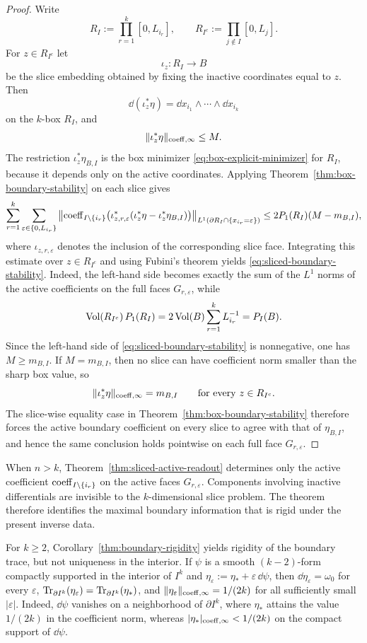 \begin{proof}
Write
\[
R_I:=\prod_{r=1}^k [0,L_{i_r}],
\qquad
R_{I^c}:=\prod_{j\notin I}[0,L_j].
\]
For $z\in R_{I^c}$ let
\[
\iota_z:R_I\to B
\]
be the slice embedding obtained by fixing the inactive coordinates equal to
$z$. Then
\[
\dd(\iota_z^\ast\eta)=\dd x_{i_1}\wedge\cdots\wedge \dd x_{i_k}
\]
on the $k$-box $R_I$, and
\[
\lVert \iota_z^\ast\eta \rVert_{\mathrm{coeff},\infty}\le M.
\]
The restriction $\iota_z^\ast\eta_{B,I}$ is the box minimizer
\eqref{eq:box-explicit-minimizer} for $R_I$, because it depends only on the
active coordinates. Applying Theorem~\ref{thm:box-boundary-stability} on each
slice gives
\[
\sum_{r=1}^k\sum_{\varepsilon\in\{0,L_{i_r}\}}
\left\|
\mathrm{coeff}_{I\setminus\{i_r\}}
\bigl(
\iota_{z,r,\varepsilon}^\ast(\iota_z^\ast\eta-\iota_z^\ast\eta_{B,I})
\bigr)
\right\|_{L^1(\partial R_I\cap\{x_{i_r}=\varepsilon\})}
\le
2P_1(R_I)(M-m_{B,I}),
\]
where $\iota_{z,r,\varepsilon}$ denotes the inclusion of the corresponding
slice face. Integrating this estimate over $z\in R_{I^c}$ and using Fubini's
theorem yields \eqref{eq:sliced-boundary-stability}. Indeed, the left-hand
side becomes exactly the sum of the $L^1$ norms of the active coefficients on
the full faces $G_{r,\varepsilon}$, while
\[
\operatorname{Vol}(R_{I^c})\,P_1(R_I)
=
2\operatorname{Vol}(B)\sum_{r=1}^k L_{i_r}^{-1}
=
P_I(B).
\]
Since the left-hand side of \eqref{eq:sliced-boundary-stability} is
nonnegative, one has $M\ge m_{B,I}$. If $M=m_{B,I}$, then no slice can have
coefficient norm smaller than the sharp box value, so
\[
\lVert \iota_z^\ast\eta \rVert_{\mathrm{coeff},\infty}=m_{B,I}
\qquad
\text{for every }z\in R_{I^c}.
\]
The slice-wise equality case in Theorem~\ref{thm:box-boundary-stability}
therefore forces the active boundary coefficient on every slice to agree with
that of $\eta_{B,I}$, and hence the same conclusion holds pointwise on each
full face $G_{r,\varepsilon}$.
\end{proof}

\begin{remark}
When $n>k$, Theorem~\ref{thm:sliced-active-readout} determines only the active
coefficient $\mathrm{coeff}_{I\setminus\{i_r\}}$ on the active faces
$G_{r,\varepsilon}$. Components involving inactive differentials are invisible
to the $k$-dimensional slice problem. The theorem therefore identifies the
maximal boundary information that is rigid under the present inverse data.
\end{remark}

\begin{remark}
For $k\ge 2$, Corollary~\ref{thm:boundary-rigidity} yields rigidity of the
boundary trace, but not uniqueness in the interior. If
$\psi$ is a smooth $(k-2)$-form compactly supported in the interior of $I^k$
and $\eta_\varepsilon:=\eta_\ast+\varepsilon\,\dd\psi$, then
$\dd\eta_\varepsilon=\omega_0$ for every $\varepsilon$,
$\operatorname{Tr}_{\partial I^k}(\eta_\varepsilon)=\operatorname{Tr}_{\partial I^k}(\eta_\ast)$, and
$\lVert \eta_\varepsilon \rVert_{\mathrm{coeff},\infty}=1/(2k)$ for all sufficiently small
$|\varepsilon|$. Indeed, $\dd\psi$ vanishes on a neighborhood of
$\partial I^k$, where $\eta_\ast$ attains the value $1/(2k)$ in the
coefficient norm, whereas $\lvert \eta_\ast \rvert_{\mathrm{coeff},\infty}<1/(2k)$ on the
compact support of $\dd\psi$.
\end{remark}

